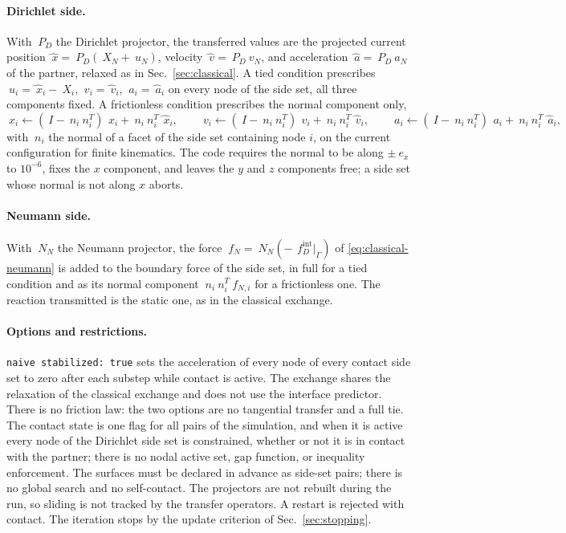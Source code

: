 \documentclass[11pt]{article}
\newcommand{\code}[1]{\texttt{#1}}
\begin{document}
\paragraph{Dirichlet side.} With $~P_D$ the Dirichlet projector, the
transferred values are the projected current position
$\hat{~x} = ~P_D(~X_N + ~u_N)$, velocity $\hat{~v} = ~P_D ~v_N$, and
acceleration $\hat{~a} = ~P_D ~a_N$ of the partner, relaxed as in
Sec.~\ref{sec:classical}. A tied condition prescribes
$~u_i = \hat{~x}_i - ~X_i$, $~v_i = \hat{~v}_i$, $~a_i = \hat{~a}_i$ on every
node of the side set, all three components fixed. A frictionless
condition prescribes the normal component only,
\begin{equation}
  ~x_i \leftarrow (~I - ~n_i ~n_i^T)\, ~x_i + ~n_i ~n_i^T\, \hat{~x}_i,
  \qquad
  ~v_i \leftarrow (~I - ~n_i ~n_i^T)\, ~v_i + ~n_i ~n_i^T\, \hat{~v}_i,
  \qquad
  ~a_i \leftarrow (~I - ~n_i ~n_i^T)\, ~a_i + ~n_i ~n_i^T\, \hat{~a}_i,
  \label{eq:contact-frictionless}
\end{equation}
with $~n_i$ the normal of a facet of the side set containing node $i$, on
the current configuration for finite kinematics. The code requires the
normal to be along $\pm ~e_x$ to $10^{-6}$, fixes the $x$ component, and
leaves the $y$ and $z$ components free; a side set whose normal is not
along $x$ aborts.

\paragraph{Neumann side.} With $~N_N$ the Neumann projector, the force
$~f_N = ~N_N(-\,~f^{\mathrm{int}}_D|_\Gamma)$ of \eqref{eq:classical-neumann}
is added to the boundary force of the side set, in full for a tied
condition and as its normal component $~n_i ~n_i^T ~f_{N,i}$ for a
frictionless one. The reaction transmitted is the static one, as in the
classical exchange.

\paragraph{Options and restrictions.} \code{naive stabilized: true} sets
the acceleration of every node of every contact side set to zero after
each substep while contact is active. The exchange shares the relaxation
of the classical exchange and does not use the interface predictor. There
is no friction law: the two options are no tangential transfer and a full
tie. The contact state is one flag for all pairs of the simulation, and
when it is active every node of the Dirichlet side set is constrained,
whether or not it is in contact with the partner; there is no nodal active set, gap
function, or inequality enforcement. The surfaces must be declared in
advance as side-set pairs; there is no global search and no self-contact.
The projectors are not rebuilt during the run, so sliding is not tracked
by the transfer operators. A restart is rejected with contact. The
iteration stops by the update criterion of Sec.~\ref{sec:stopping}.
\end{document}
